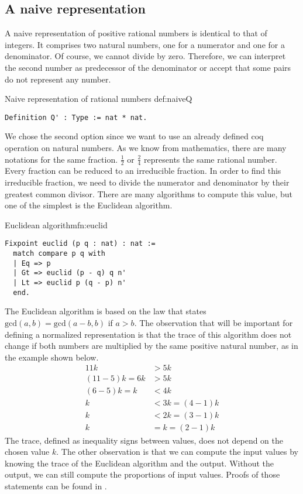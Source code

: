 \subsection{A naive representation}
A naive representation of positive rational numbers is identical to that of integers. It comprises two natural numbers, one for a numerator and one for a denominator. Of course, we cannot divide by zero. Therefore, we can interpret the second number as predecessor of the denominator or accept that some pairs do not represent any number.
\begin{defi}{Naive representation of rational numbers }{def:naiveQ}
\begin{verbatim}
Definition Q' : Type := nat * nat.
\end{verbatim}
\end{defi}
We chose the second option since we want to use an already defined coq operation on natural numbers. As we know from mathematics, there are many notations for the same fraction. $\frac{1}{2}$ or $\frac{2}{4}$ represents the same rational number. Every fraction can be reduced to an irreducible fraction. In order to find this irreducible fraction, we need to divide the numerator and denominator by their greatest common divisor. There are many algorithms to compute this value, but one of the simplest is the Euclidean algorithm.
\begin{func}{Euclidean algorithm}{fn:euclid}
\begin{verbatim}
Fixpoint euclid (p q : nat) : nat :=
  match compare p q with
  | Eq => p
  | Gt => euclid (p - q) q n'
  | Lt => euclid p (q - p) n'
  end.
\end{verbatim}
\end{func}
The Euclidean algorithm is based on the law that states $\textrm{gcd}(a, b) = \textrm{gcd}(a - b, b)$ if $a > b$. The observation that will be important for defining a normalized representation is that the trace of this algorithm does not change if both numbers are multiplied by the same positive natural number, as in the example shown below.
\begin{equation}
    \begin{split}
        11k&>5k\\
        (11-5)k=6k&>5k\\
        (6-5)k=k&<4k\\
        k&<3k=(4-1)k\\
        k&<2k=(3-1)k\\
        k&=k=(2-1)k
    \end{split}
\end{equation}
The trace,  defined as inequality signs between values, does not depend on the chosen value $k$. The other observation is that we can compute the input values by knowing the trace of the Euclidean algorithm and the output. Without the output, we can still compute the proportions of input values. Proofs of those statements can be found in .

